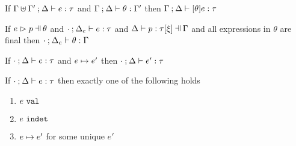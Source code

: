 \begin{lemma}
  \label{lem:simult-substitution}
  If $\Gamma \uplus \Gamma' \mathbin{;} \Delta \vdash e : \tau$ and $\Gamma \mathbin{;} \Delta \vdash \theta : \Gamma'$
  then $\Gamma \mathbin{;} \Delta \vdash [\theta]e : \tau$
\end{lemma}

\begin{lemma}
  \label{lem:subs-typing}
  If $\hpatmatch{e}{p}{\theta}$ and $\cdot \mathbin{;} \Delta_e \vdash e : \tau$ and $\chpattyp{p}{\tau}{\xi}{\Gamma}{\Delta}$ and all expressions in $\theta$ are final
  then $\cdot \mathbin{;} \Delta_e \vdash \theta : \Gamma$
\end{lemma}

\begin{theorem}[Preservation]
  \label{thrm:preservation}
  If $\cdot \mathbin{;} \Delta \vdash e : \tau$ and $e \mapsto e'$
  then $\cdot \mathbin{;} \Delta \vdash e' : \tau$
\end{theorem}

\begin{theorem}[Determinism]
  \label{thrm:determinism}
  If $\cdot \mathbin{;} \Delta \vdash e : \tau$ then exactly one of the following holds
  \begin{enumerate}
    \item $e ~\mathtt{val}$
    \item $e ~\mathtt{indet}$
    \item $e \mapsto e'$ for some unique $e'$
  \end{enumerate}
\end{theorem}

